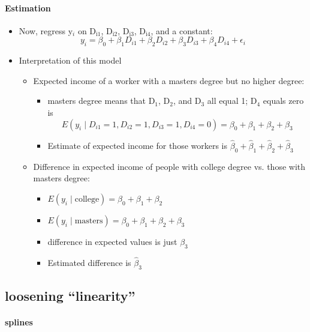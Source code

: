 \paragraph{Estimation}
\begin{itemize}
\item Now, regress y$_i$ on D$_{\mathrm{i1}}$, D$_{\mathrm{i2}}$, D$_{\mathrm{i3}}$, D$_{\mathrm{i4}}$, and a constant:
        \[ y_i = \beta_0 + \beta_1 D_{i1} + \beta_2 D_{i2} + \beta_3
        D_{i3} + \beta_4 D_{i4} + \epsilon_i \]
\item Interpretation of this model
\begin{itemize}
\item Expected income of a worker with a masters degree but no
          higher degree:
\begin{itemize}
\item masters degree means that D$_1$, D$_2$, and D$_3$ all equal 1;
            D$_4$ equals zero is
            \[ E(y_i \mid D_{i1}=1,D_{i2}=1,D_{i3}=1,D_{i4}=0) =
            \beta_0 + \beta_1 + \beta_2 + \beta_3 \]
\item Estimate of expected income for those workers is $\hat
            \beta_0 + \hat\beta_1 + \hat\beta_2 + \hat\beta_3$
\end{itemize}
\item Difference in expected income of people with college degree
          vs. those with masters degree:
\begin{itemize}
\item $E(y_i \mid \text{college}) = \beta_0 + \beta_1 + \beta_2$
\item $E(y_i \mid \text{masters}) = \beta_0 + \beta_1 +
            \beta_2 + \beta_3$
\item difference in expected values is just $\beta_3$
\item Estimated difference is $\hat\beta_3$
\end{itemize}
\end{itemize}
\end{itemize}

\subsection{loosening ``linearity''}

\paragraph{splines}

